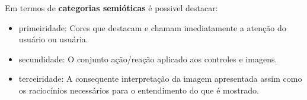 \begin{frame}[allowframebreaks]
	\par Em termos de \textbf{categorias semióticas} \cite{santaella2017semiotica} é possivel destacar:
	\begin{itemize}
		\item primeiridade: Cores que destacam e chamam imediatamente a atenção do usuário ou usuária.
		\item secundidade: O conjunto ação/reação aplicado aos controles e imagens.
		\item terceiridade: A consequente interpretação da imagem apresentada assim como os raciocínios necessários para o entendimento do que é mostrado.
	\end{itemize}

\end{frame}